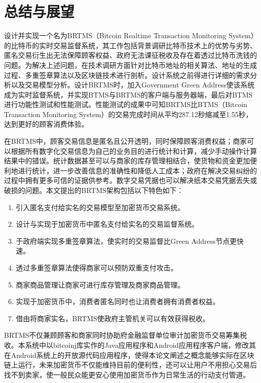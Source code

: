    
\chapter{总结与展望}
设计并实现一个名为BRTMS（Bitcoin Realtime Transaction Monitoring System）的比特币的实时交易监督系统，其工作包括背景调研比特币技术上的优势与劣势、匿名交易衍生出无法保障顾客权益、政府无法课征税收及存在着透过比特币洗钱的问题。为解决上述问题，在技术调研方面针对比特币地址的相关算法、地址的生成过程、多重签章算法以及区块链技术进行剖析。设计系统之前得进行详细的需求分析以及交易模型分析。设计BRTMS时，加入Government Green Address使该系统成为实时监督系统，并实现BTMS与BRTMS的客户端与服务器端，最后对BTMS进行功能性测试和性能测试。性能测试的成果中可知BRTMS比BTMS（Bitcoin Transaction Monitoring System）的交易完成时间从平均287.12秒缩减至1.55秒，达到更好的顾客消费体验。

在BRTMS中，顾客交易信息是匿名且公开透明，同时保障顾客消费权益；商家可以根据所有数字化交易信息为自己的业务目的进行统计和计算，减少手动操作计算结果中的错误。统计数据甚至可以与商家的库存管理相结合，使货物和资金更加便利地进行统计，进一步改善信息的准确性和降低人工成本；政府在解决交易纠纷的过程中拥有更多可信的证据供参考。数字交易凭据也可以解决纸本交易凭据丢失或破损的问题。本文提出的BRTMS架构包括以下特色如下：
		\begin{enumerate}
			\item 引入匿名支付给实名的交易模型至加密货币交易系统。
			\item 设计与实现于加密货币中匿名支付给实名的交易监督系统。
			\item 于政府端实现多重签章算法，使实时的交易监督比Green Address节点更快速。
			\item 透过多重签章算法使得商家可以预防双重支付攻击。
			\item 商家商品管理让商家可进行库存管理及商家商品管理。
			\item 实现于加密货币中，消费者匿名同时也让消费者拥有消费者权益。
			\item 借由将商家实名，BRTMS使政府主管机关可以有效获得税收。
		\end{enumerate}



		
BRTMS不仅兼顾顾客和商家同时协助府金融监督单位审计加密货币交易筹集税收。本系统中以bitcoinj库实作的Java应用程序和Android应用程序客户端，修改其在Android系统上的开放源代码应用程序，使得本论文阐述之概念能够实际在区块链上运行，未来加密货币不仅能维持目前的便利性，还可以让用户不用担心交易后找不到卖家，使一般民众能更安心使用加密货币作为日常生活的行动支付管道。
